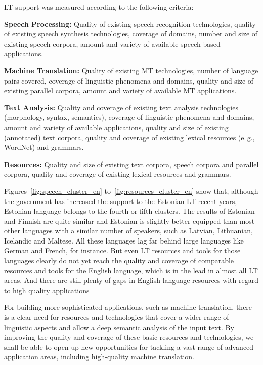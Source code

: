\begin{multicols}{2}
LT support was measured according to the following criteria:

\textbf{Speech Processing:} Quality of existing speech recognition technologies, quality of existing speech synthesis technologies, coverage of domains, number and size of existing speech corpora, amount and variety of available speech-based applications.

\textbf{Machine Translation:} Quality of existing MT technologies, number of language pairs covered, coverage of linguistic phenomena and domains, quality and size of existing parallel corpora, amount and variety of available MT applications.

\textbf{Text Analysis:} Quality and coverage of existing text analysis technologies (morphology, syntax, semantics), coverage of linguistic phenomena and domains, amount and variety of available applications, quality and size of existing (annotated) text corpora, quality and coverage of existing lexical resources (e.\,g., WordNet) and grammars.

\textbf{Resources:} Quality and size of existing text corpora, speech corpora and parallel corpora, quality and coverage of existing lexical resources and grammars.

Figures~\ref{fig:speech_cluster_en} to~\ref{fig:resources_cluster_en} show that, although the government has increased the support to the Estonian LT recent years, Estonian language belongs to the fourth or fifth clusters.  The results of Estonian and Finnish are quite similar and Estonian is slightly better equipped than most other languages with a similar number of speakers, such as Latvian, Lithuanian, Icelandic and Maltese.  All these languages lag far behind large languages like German and French, for instance.  But even LT resources and tools for those languages clearly do not yet reach the quality and coverage of comparable resources and tools for the English language, which is in the lead in almost all LT areas.  And there are still plenty of gaps in English language resources with regard to high quality applications

For building more sophisticated applications, such as machine translation, there is a clear need for resources and technologies that cover a wider range of linguistic aspects and allow a deep semantic analysis of the input text. By improving the quality and coverage of these basic resources and technologies, we shall be able to open up new opportunities for tackling a vast range of advanced application areas, including high-quality machine translation.


\end{multicols}
